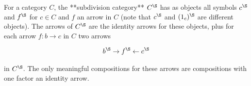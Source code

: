 For a category $C$, the **subdivision category** $C^{\S}$ has as objects all symbols $c^{\S}$ and $f^{\S}$ for $c \in C$ and $f$ an arrow in $C$ (note that $c^{\S}$ and $(1_c)^{\S}$ are different objects). The arrows of $C^{\S}$ are the identity arrows for these objects, plus for each arrow $f: b \rightarrow c$ in $C$ two arrows

$$b^{\S} \rightarrow f^{\S} \leftarrow c^{\S}$$

in $C^{\S}$. The only meaningful compositions for these arrows are compositions with one factor an identity arrow.
